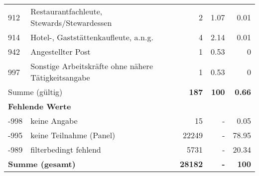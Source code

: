\begin{longtable}{lXrrr}
        912 & \multicolumn{1}{X}{Restaurantfachleute, Stewards/Stewardessen} & %
          \num{2} &
          \num[round-mode=places,round-precision=2]{1,07} &
          \num[round-mode=places,round-precision=2]{0,01} \\

        914 & \multicolumn{1}{X}{Hotel-, Gaststättenkaufleute, a.n.g.} & %
          \num{4} &
          \num[round-mode=places,round-precision=2]{2,14} &
          \num[round-mode=places,round-precision=2]{0,01} \\

        942 & \multicolumn{1}{X}{Angestellter Post} & %
          \num{1} &
          \num[round-mode=places,round-precision=2]{0,53} &
          \num[round-mode=places,round-precision=2]{0} \\

        997 & \multicolumn{1}{X}{Sonstige Arbeitskräfte ohne nähere Tätigkeitsangabe} & %
          \num{1} &
          \num[round-mode=places,round-precision=2]{0,53} &
          \num[round-mode=places,round-precision=2]{0} \\

     \midrule
     \multicolumn{2}{l}{Summe (gültig)} &
       \textbf{\num{187}} &
     \textbf{100} &
       \textbf{\num[round-mode=places,round-precision=2]{0,66}} \\
     \multicolumn{5}{l}{\textbf{Fehlende Werte}}\\
       -998 &
       keine Angabe &
         \num{15} &
        - &
         \num[round-mode=places,round-precision=2]{0,05} \\
       -995 &
       keine Teilnahme (Panel) &
         \num{22249} &
        - &
         \num[round-mode=places,round-precision=2]{78,95} \\
       -989 &
       filterbedingt fehlend &
         \num{5731} &
        - &
         \num[round-mode=places,round-precision=2]{20,34} \\
     \midrule
     \multicolumn{2}{l}{\textbf{Summe (gesamt)}} &
          \textbf{\num{28182}} &
        \textbf{-} &
        \textbf{100} \\
     \bottomrule
     \end{longtable}
     
